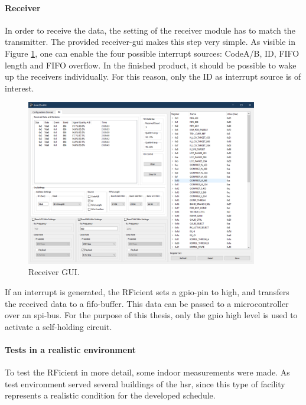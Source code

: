 \paragraph{Receiver}
In order to receive the data, the setting of the receiver module has to match the transmitter.
The provided receiver-\acs{gui} makes this step very simple.
As visible in Figure \ref{development:rx}, one can enable the four possible interrupt sources: CodeA/B, ID, FIFO length and FIFO overflow.
In the finished product, it should be possible to wake up the receivers individually.
For this reason, only the ID as interrupt source is of interest.
\begin{figure}[ht]
	\centering
	\includegraphics[width=0.9\textwidth]{4-development/hardware/graphics/RXgui.png}
	\caption{Receiver GUI.\label{development:rx}}
\end{figure}
If an interrupt is generated, the RFicient sets a \acs{gpio}-pin to high, and transfers the received data to a \acs{fifo}-buffer.
This data can be passed to a microcontroller over an \acs{spi}-bus.
For the purpose of this thesis, only the \acs{gpio} high level is used to activate a self-holding circuit.

\paragraph{Tests in a realistic environment}
To test the RFicient in more detail, some indoor measurements were made.
As test environment served several buildings of the \acf{hsr}, since this type of facility represents a realistic condition for the developed schedule.

